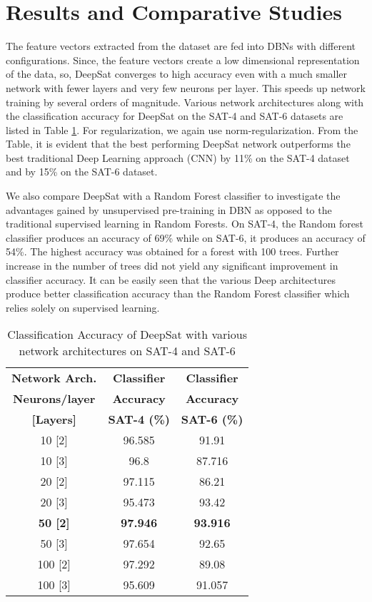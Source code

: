 \documentclass[11pt,a4paper]{article}
\begin{document}
\section{Results and Comparative Studies}
The feature vectors extracted from the dataset are fed into DBNs with different configurations. Since, the feature vectors create a low dimensional representation of the data, so, DeepSat converges to high accuracy even with a much smaller network with fewer layers and very few neurons per layer. This speeds up network training by several orders of magnitude. Various network architectures along with the classification accuracy for DeepSat on the SAT-4 and SAT-6 datasets are listed in Table \ref{table:DeepSat_accuracy_SAT_4_and_6}. For regularization, we again use  norm-regularization. From the Table, it is evident that the best performing DeepSat network outperforms the best traditional Deep Learning approach (CNN) by 11\% on the SAT-4 dataset and by 15\% on the SAT-6 dataset.    

We also compare DeepSat with a Random Forest classifier to investigate the advantages gained by unsupervised pre-training in DBN as opposed to the traditional supervised learning in Random Forests. On SAT-4, the Random forest classifier produces an accuracy of 69\% while on SAT-6, it produces an accuracy of 54\%. The highest accuracy was obtained for a forest with 100 trees. Further increase in the number of trees did not yield any significant improvement in classifier accuracy. It can be easily seen that the various Deep architectures produce better classification accuracy than the Random Forest classifier which relies solely on supervised learning.    

\begin{table}[h!]
\centering
\begin{tabular}{ | c | c | c | }
    \hline
    \textbf{Network Arch.} & \textbf{Classifier} & \textbf{Classifier}\\ 
    \textbf{Neurons/layer} &   \textbf{Accuracy} & \textbf{Accuracy} \\ 
    \textbf{[Layers]} & \textbf{SAT-4 (\%)} & \textbf{SAT-6 (\%)} \\ \hline
    10 [2] & 96.585 & 91.91\\ \hline
    10 [3] & 96.8  & 87.716 \\ \hline
    20 [2] & 97.115 & 86.21 \\ \hline
    20 [3] & 95.473 & 93.42 \\ \hline
    \textbf{50 [2]} & \textbf{97.946} &\textbf{93.916} \\ \hline
    50 [3] & 97.654 & 92.65 \\ \hline
    100 [2] & 97.292 & 89.08 \\ \hline
    100 [3] & 95.609 & 91.057 \\ \hline
  \end{tabular}
  \caption{Classification Accuracy of DeepSat with various network architectures on SAT-4 and SAT-6}
  \label{table:DeepSat_accuracy_SAT_4_and_6}
\end{table}
\end{document}
